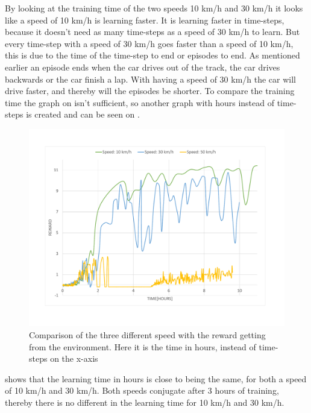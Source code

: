 By looking at the training time of the two speeds 10 km/h and 30 km/h it looks like a speed of 10 km/h is learning faster. It is learning faster in time-steps, because it doesn't need as many time-steps as a speed of 30 km/h to learn. But every time-step with a speed of 30 km/h goes faster than a speed of 10 km/h, this is due to the time of the time-step to end or episodes to end. As mentioned earlier an episode ends when the car drives out of the track, the car drives backwards or the car finish a lap. With having a speed of 30 km/h the car will drive faster, and thereby will the episodes be shorter. To compare the training time the graph on  isn't sufficient, so another graph with hours instead of time-steps is created and can be seen on .
\begin{figure}[H]
	\centering
	\includegraphics[width=1\textwidth]{Figures/Result/change_of_acceleration_reward_hours_graph.pdf}
	\caption{Comparison of the three different speed with the reward getting from the environment. Here it is the time in hours, instead of time-steps on the x-axis}
	\label{fig:change_of_acceleration_reward_hours_graph}
\end{figure}

 shows that the learning time in hours is close to being the same, for both a speed of 10 km/h and 30 km/h. Both speeds conjugate after 3 hours of training, thereby there is no different in the learning time for 10 km/h and 30 km/h.


